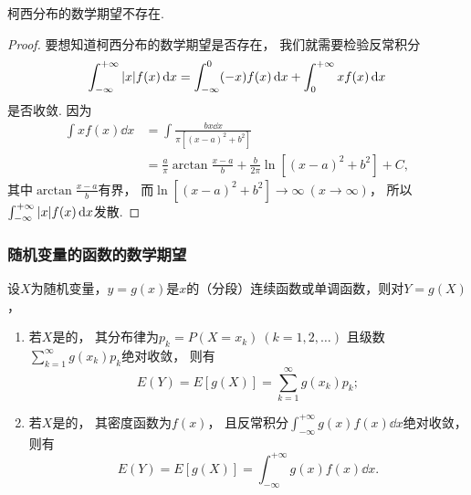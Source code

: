\begin{proposition}
柯西分布的数学期望不存在.
\begin{proof}
要想知道柯西分布的数学期望是否存在，
我们就需要检验反常积分\[
	\int_{-\infty}^{+\infty} \abs{x} f(x) \dd{x}
	= \int_{-\infty}^0 (-x) f(x) \dd{x}
	+ \int_0^{+\infty} x f(x) \dd{x}
\]是否收敛.
因为\begin{align*}
	\int x f(x) \dd{x}
	&= \int \frac{b x \dd{x}}{\pi[(x-a)^2+b^2]} \\
	&= \frac{a}{\pi} \arctan\frac{x-a}{b} + \frac{b}{2\pi} \ln[(x-a)^2+b^2] + C,
\end{align*}
其中\(\arctan\frac{x-a}{b}\)有界，
而\(\ln[(x-a)^2+b^2]\to\infty\ (x\to\infty)\)，
所以\(\int_{-\infty}^{+\infty} \abs{x} f(x) \dd{x}\)发散.
\end{proof}
\end{proposition}

\subsubsection{随机变量的函数的数学期望}
\begin{theorem}\label{theorem:随机变量的数字特征.一维随机变量的函数的数学期望}
设\(X\)为随机变量，\(y=g(x)\)是\(x\)的（分段）连续函数或单调函数，则对\(Y=g(X)\)，
\begin{enumerate}
	\item 若\(X\)是的，
	其分布律为\(p_k = P(X=x_k)\ (k=1,2,\dotsc)\)
	且级数\(\sum_{k=1}^\infty g(x_k) p_k\)绝对收敛，
	则有\[
		E(Y) = E[g(X)] = \sum_{k=1}^\infty {g(x_k) p_k};
	\]
	\item 若\(X\)是的，
	其密度函数为\(f(x)\)，
	且反常积分\(\int_{-\infty}^{+\infty} g(x) f(x) \dd{x}\)绝对收敛，
	则有\[
		E(Y) = E[g(X)] = \int_{-\infty}^{+\infty} g(x) f(x) \dd{x}.
	\]
\end{enumerate}
\end{theorem}

